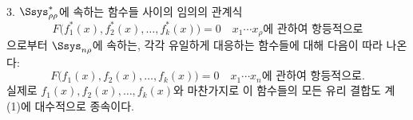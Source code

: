 
3. $\Ssys^*_{\rho\rho}$에 속하는 함수들 사이의 임의의 관계식
\[
F\bigl(f_1^*(x),f_2^*(x),\ldots,f_k^*(x)\bigr)=0
\quad\text{$x_1\cdots x_\rho$에 관하여 항등적으로}
\]
으로부터 $\Ssys_{n\rho}$에 속하는, 각각 유일하게 대응하는 함수들에 대해 다음이 따라 나온다:
\[
F\bigl(f_1(x),f_2(x),\ldots,f_k(x)\bigr)=0
\quad\text{$x_1\cdots x_n$에 관하여 항등적으로}.
\]
실제로 $f_1(x),f_2(x),\ldots,f_k(x)$와 마찬가지로 이 함수들의 모든 유리 결합도 계 (1)에 대수적으로 종속이다.
